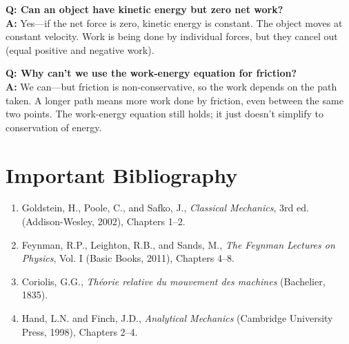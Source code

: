 \textbf{Q: Can an object have kinetic energy but zero net work?}\\
\textbf{A:} Yes---if the net force is zero, kinetic energy is constant. The object moves at constant velocity. Work is being done by individual forces, but they cancel out (equal positive and negative work).

\textbf{Q: Why can't we use the work-energy equation for friction?}\\
\textbf{A:} We can---but friction is non-conservative, so the work depends on the path taken. A longer path means more work done by friction, even between the same two points. The work-energy equation still holds; it just doesn't simplify to conservation of energy.
\section*{Important Bibliography}

\begin{enumerate}
\item Goldstein, H., Poole, C., and Safko, J., \textit{Classical Mechanics}, 3rd ed. (Addison-Wesley, 2002), Chapters 1--2.
\item Feynman, R.P., Leighton, R.B., and Sands, M., \textit{The Feynman Lectures on Physics}, Vol. I (Basic Books, 2011), Chapters 4--8.
\item Coriolis, G.G., \textit{Th\'eorie relative du mouvement des machines} (Bachelier, 1835).
\item Hand, L.N. and Finch, J.D., \textit{Analytical Mechanics} (Cambridge University Press, 1998), Chapters 2--4.
\end{enumerate}


